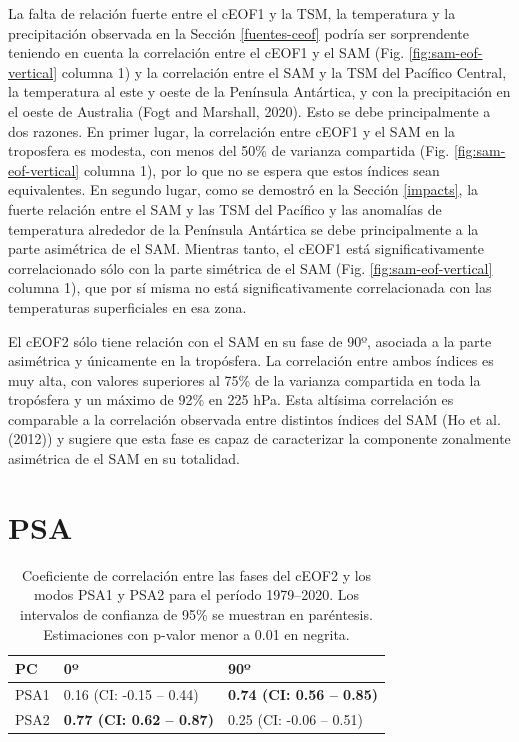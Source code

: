 \documentclass[12pt,oneside]{reedthesis}
\begin{document}
La falta de relación fuerte entre el cEOF1 y la TSM, la temperatura y la precipitación observada en la Sección \ref{fuentes-ceof} podría ser sorprendente teniendo en cuenta la correlación entre el cEOF1 y el SAM (Fig. \ref{fig:sam-eof-vertical} columna 1) y la correlación entre el SAM y la TSM del Pacífico Central, la temperatura al este y oeste de la Península Antártica, y con la precipitación en el oeste de Australia (Fogt and Marshall, 2020).
Esto se debe principalmente a dos razones.
En primer lugar, la correlación entre cEOF1 y el SAM en la troposfera es modesta, con menos del 50\% de varianza compartida (Fig. \ref{fig:sam-eof-vertical} columna 1), por lo que no se espera que estos índices sean equivalentes.
En segundo lugar, como se demostró en la Sección \ref{impacts}, la fuerte relación entre el SAM y las TSM del Pacífico y las anomalías de temperatura alrededor de la Península Antártica se debe principalmente a la parte asimétrica de el SAM.
Mientras tanto, el cEOF1 está significativamente correlacionado sólo con la parte simétrica de el SAM (Fig. \ref{fig:sam-eof-vertical} columna 1), que por sí misma no está significativamente correlacionada con las temperaturas superficiales en esa zona.

El cEOF2 sólo tiene relación con el SAM en su fase de 90º, asociada a la parte asimétrica y únicamente en la tropósfera.
La correlación entre ambos índices es muy alta, con valores superiores al 75\% de la varianza compartida en toda la tropósfera y un máximo de 92\% en 225 hPa.
Esta altísima correlación es comparable a la correlación observada entre distintos índices del SAM (Ho et al. (2012)) y sugiere que esta fase es capaz de caracterizar la componente zonalmente asimétrica de el SAM en su totalidad.

\hypertarget{psa}{%
\section{PSA}\label{psa}}





\begin{table}

\caption{\label{tab:psa-eof2}Coeficiente de correlación entre las fases del cEOF2 y los modos PSA1 y PSA2 para el período 1979--2020.
Los intervalos de confianza de 95\% se muestran en paréntesis.
Estimaciones con p-valor menor a 0.01 en negrita.}
\centering
\begin{tabular}[t]{l>{}l>{}l}
\toprule
PC & 0º & 90º\\
\midrule
PSA1 & 0.16 (CI: -0.15 -- 0.44) & \textbf{0.74 (CI: 0.56 -- 0.85)}\\
\cmidrule{1-3}
PSA2 & \textbf{0.77 (CI: 0.62 -- 0.87)} & 0.25 (CI: -0.06 -- 0.51)\\
\bottomrule
\end{tabular}
\end{table}
\end{document}
